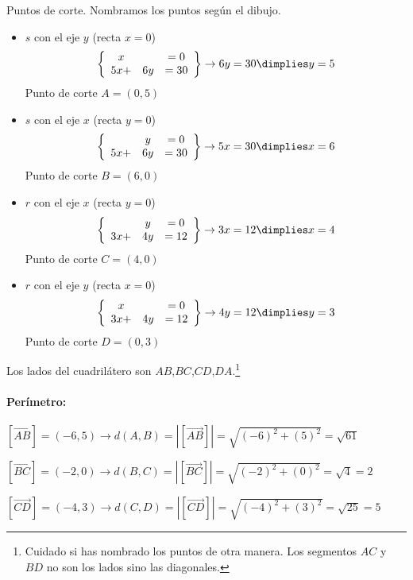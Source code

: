 \documentclass[palatino,nosec,nochap,nobuilddate]{Docencia}
\begin{document}
\begin{problem}[111]
Puntos de corte. Nombramos los puntos según el dibujo.
\begin{itemize}

	\item $s$ con el eje $y$ (recta $x=0$)
	\[
		\left\{\begin{array}{ccc}
			x&&=0\\
			5x+&6y &= 30
		\end{array}\right\}\to 6y=30 \dimplies y=5
	\]
	Punto de corte $A = (0,5)$
	
	\item $s$ con el eje $x$ (recta $y=0$)
	\[
		\left\{\begin{array}{ccc}
			&y&=0\\
			5x+&6y &= 30
		\end{array}\right\}\to 5x=30 \dimplies x=6
	\]
	Punto de corte $B = (6,0)$

	\item $r$ con el eje $x$ (recta $y=0$)
	\[
		\left\{\begin{array}{ccc}
			&y&=0\\
			3x+&4y &= 12
		\end{array}\right\}\to 3x=12 \dimplies x=4
	\]
	Punto de corte $C = (4,0)$
	\item $r$ con el eje $y$ (recta $x=0$)
	\[
		\left\{\begin{array}{ccc}
			x&&=0\\
			3x+&4y &= 12
		\end{array}\right\}\to 4y=12 \dimplies y=3
	\]
	Punto de corte $D = (0,3)$

\end{itemize}

Los lados del cuadrilátero son $AB$,$BC$,$CD$,$DA$.\footnote{Cuidado si has nombrado los puntos de otra manera. Los segmentos $AC$ y $BD$ no son los lados sino las diagonales.}

\paragraph{Perímetro:} 

$[\overrightarrow{AB}]= (-6,5) \to  d(A,B) = |[\overrightarrow{AB}]| = \sqrt{(-6)^2+(5)^2} = \sqrt{61}$

$[\overrightarrow{BC}]= (-2,0) \to  d(B,C) = |[\overrightarrow{BC}]| = \sqrt{(-2)^2+(0)^2} = \sqrt{4} = 2$

$[\overrightarrow{CD}]= (-4,3) \to  d(C,D) = |[\overrightarrow{CD}]| = \sqrt{(-4)^2+(3)^2} = \sqrt{25} = 5$


\end{problem}
\end{document}
